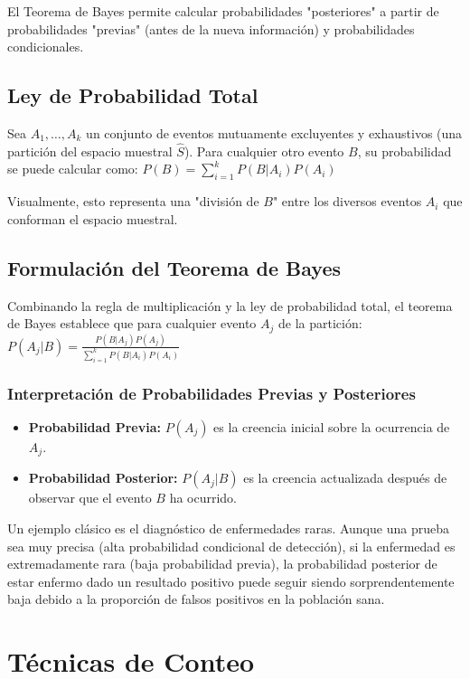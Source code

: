 \documentclass[a4paper]{article}
\begin{document}
El Teorema de Bayes permite calcular probabilidades "posteriores" a partir de probabilidades "previas" (antes de la nueva información) y probabilidades condicionales.

\subsection{Ley de Probabilidad Total}

Sea $A_1, \dots, A_k$ un conjunto de eventos mutuamente excluyentes y exhaustivos (una partición del espacio muestral $\hat{S}$). Para cualquier otro evento $B$, su probabilidad se puede calcular como:
$P(B) = \sum_{i=1}^{k} P(B | A_i)P(A_i)$

Visualmente, esto representa una "división de $B$" entre los diversos eventos $A_i$ que conforman el espacio muestral.

\subsection{Formulación del Teorema de Bayes}

Combinando la regla de multiplicación y la ley de probabilidad total, el teorema de Bayes establece que para cualquier evento $A_j$ de la partición:
$P(A_j | B) = \frac{P(B | A_j)P(A_j)}{\sum_{i=1}^{k} P(B | A_i)P(A_i)}$

\subsubsection{Interpretación de Probabilidades Previas y Posteriores}

\begin{itemize}
    \item \textbf{Probabilidad Previa:} $P(A_j)$ es la creencia inicial sobre la ocurrencia de $A_j$.
    \item \textbf{Probabilidad Posterior:} $P(A_j | B)$ es la creencia actualizada después de observar que el evento $B$ ha ocurrido.
\end{itemize}

Un ejemplo clásico es el diagnóstico de enfermedades raras. Aunque una prueba sea muy precisa (alta probabilidad condicional de detección), si la enfermedad es extremadamente rara (baja probabilidad previa), la probabilidad posterior de estar enfermo dado un resultado positivo puede seguir siendo sorprendentemente baja debido a la proporción de falsos positivos en la población sana.


\section{Técnicas de Conteo}
\end{document}
